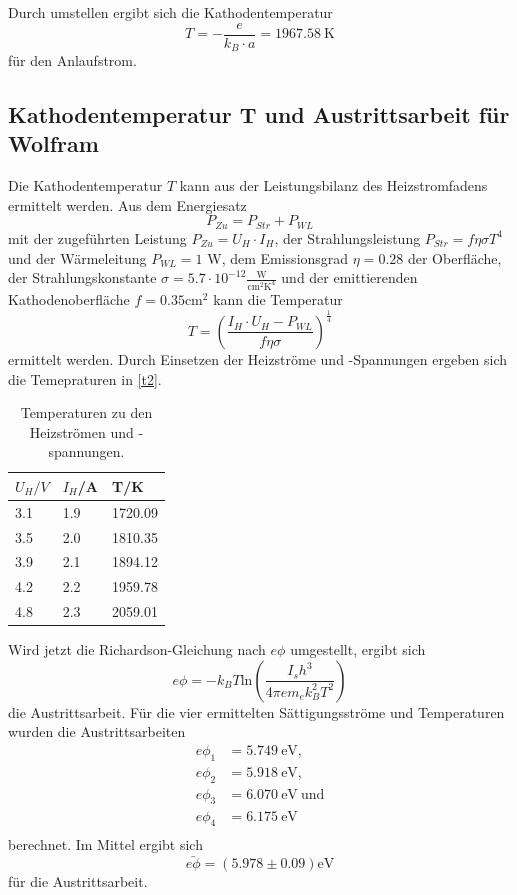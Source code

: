  Durch umstellen ergibt sich die Kathodentemperatur 
 \begin{equation*}
   T=-\frac{e}{k_{B}\cdot a}=1967.58\ \textrm{K}
 \end{equation*}
 für den Anlaufstrom. 

 \subsection{Kathodentemperatur T und Austrittsarbeit für Wolfram}
 Die Kathodentemperatur $T$ kann aus der Leistungsbilanz des Heizstromfadens ermittelt werden. Aus dem Energiesatz 
 \begin{equation*}
   P_{Zu}=P_{Str}+P_{WL}
 \end{equation*}
 mit der zugeführten Leistung $P_{Zu}=U_{H}\cdot I_{H}$, der Strahlungsleistung $P_{Str}=f\eta\sigma T^4$ und der Wärmeleitung $P_{WL}=1$ W, dem Emissionsgrad $\eta=0.28$ der Oberfläche, der Strahlungskonstante $\sigma=5.7\cdot 10^{-12} \frac{\textrm{W}}{\textrm{cm}^2\textrm{K}^4}$ und der emittierenden Kathodenoberfläche $f=0.35 \textrm{cm}^2$  kann die Temperatur
 \begin{equation*}
   T=\left(\frac{I_{H}\cdot U_{H}-P_{WL}}{f\eta\sigma}\right)^{\frac{1}{4}}
 \end{equation*}
 ermittelt werden. Durch Einsetzen der Heizströme und -Spannungen ergeben sich die Temepraturen in \autoref{t2}.
 \begin{table}[H]
 \centering
 \caption{Temperaturen zu den Heizströmen und -spannungen.}
 \begin{tabular}{l|l|l}
 $U_{H}/V$ & $I_{H}$/A & T/K\\ \hline
 3.1 & 1.9 & 1720.09\\
 3.5 & 2.0 & 1810.35\\
 3.9 & 2.1 & 1894.12\\
 4.2 & 2.2 & 1959.78\\
 4.8 & 2.3 & 2059.01
 \end{tabular}
 \label{t2}
 \end{table}
 Wird jetzt die Richardson-Gleichung nach $e\phi$ umgestellt, ergibt sich 
 \begin{equation*}
 e\phi=-k_{B}T\textrm{ln}(\frac{I_{s}h^3}{4\pi em_{e}k_{B}^2T^2})
 \end{equation*}
 die Austrittsarbeit. Für die vier ermittelten Sättigungsströme und Temperaturen wurden die Austrittsarbeiten 
 \begin{align*}
   e\phi_{1}&=5.749\ \textrm{eV},\\
   e\phi_{2}&=5.918\ \textrm{eV},\\
   e\phi_{3}&=6.070\ \textrm{eV}\ \textrm{und}\\
   e\phi_{4}&=6.175\ \textrm{eV}\\
 \end{align*}
 berechnet. Im Mittel ergibt sich 
 \begin{equation*}
   \bar{e\phi}=(5.978 \pm 0.09) \textrm{eV}
 \end{equation*}
für die Austrittsarbeit.



